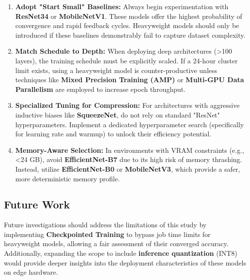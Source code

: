 \documentclass[acmsmall]{acmart}
\begin{document}
\begin{enumerate}
    \item \textbf{Adopt "Start Small" Baselines:} Always begin experimentation with \textbf{ResNet34} or \textbf{MobileNetV1}. These models offer the highest probability of convergence and rapid feedback cycles. Heavyweight models should only be introduced if these baselines demonstrably fail to capture dataset complexity.
    \item \textbf{Match Schedule to Depth:} When deploying deep architectures (>100 layers), the training schedule must be explicitly scaled. If a 24-hour cluster limit exists, using a heavyweight model is counter-productive unless techniques like \textbf{Mixed Precision Training (AMP)} or \textbf{Multi-GPU Data Parallelism} are employed to increase epoch throughput.
    \item \textbf{Specialized Tuning for Compression:} For architectures with aggressive inductive biases like \textbf{SqueezeNet}, do not rely on standard "ResNet" hyperparameters. Implement a dedicated hyperparameter search (specifically for learning rate and warmup) to unlock their efficiency potential.
    \item \textbf{Memory-Aware Selection:} In environments with VRAM constraints (e.g., <24 GB), avoid \textbf{EfficientNet-B7} due to its high risk of memory thrashing. Instead, utilize \textbf{EfficientNet-B0} or \textbf{MobileNetV3}, which provide a safer, more deterministic memory profile.
\end{enumerate}

\subsection{Future Work}
Future investigations should address the limitations of this study by implementing \textbf{Checkpointed Training} to bypass job time limits for heavyweight models, allowing a fair assessment of their converged accuracy. Additionally, expanding the scope to include \textbf{inference quantization} (INT8) would provide deeper insights into the deployment characteristics of these models on edge hardware.

\nocite{*}


\end{document}
